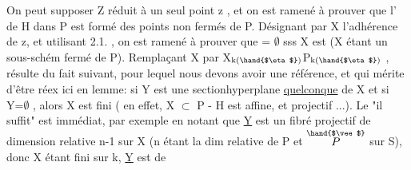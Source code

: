 On peut supposer Z réduit à un seul point z , et on est ramené à
prouver que l' de H dans P est formé  des points non fermés de P.
Désignant par X l'adhérence de z, et utilisant 2.1. , on est ramené à
prouver que \hand{$_\eta$} = $\emptyset$ sss X est   (X étant un sous-schém%
fermé  de P). Remplaçant X par X$_{\text{k(\hand{$\eta$})}}$\hand{$\hookrightarrow$}P$_{\text{k(\hand{$\eta$})}}$ ,   résulte du fait
\margin{$|$}suivant, pour lequel nous devons avoir une référence, et qui mérite d'être
réex ici en lemme: si Y est une sectionhyperplane \uline{quelconque} de
X et si Y\hand{\unsure{$_\eta$}}=$\emptyset$ , alors X est fini ( en effet, X $\subset$ P - H est affine, et
projectif ...). Le "il suffit" est immédiat, par exemple en notant que
\uline{Y} est un fibré projectif de dimension relative n-1 sur X (n étant la
dim relative de P  et $\overset{\hand{$\vee$}}{P}$ sur S), donc X étant fini sur k, \uline{Y} est de

